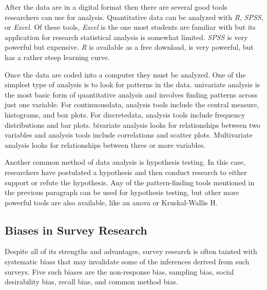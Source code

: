 After the data are in a digital format then there are several good tools researchers can use for analysis. Quantitative data can be analyzed with \textit{R}, \textit{SPSS}, or \textit{Excel}. Of these tools, \textit{Excel} is the one most students are familiar with but its application for research statistical analysis is somewhat limited. \textit{SPSS} is very powerful but expensive. \textit{R} is available as a free download, is very powerful, but has a rather steep learning curve. 

Once the data are coded into a computer they must be analyzed. One of the simplest type of analysis is to look for patterns in the data. \Gls{univariate} analysis is the most basic form of quantitative analysis and involves finding patterns across just one variable. For \gls{continuousdata}, analysis tools include the central measure, histograms, and box plots. For \gls{discretedata}, analysis tools include frequency distributions and bar plots. \Gls{bivariate} analysis looks for relationships between two variables and analysis tools include correlations and scatter plots. Multivariate analysis looks for relationships between three or more variables. 

Another common method of data analysis is hypothesis testing. In this case, researchers have postulated a \gls{hypothesis} and then conduct research to either support or refute the hypothesis. Any of the pattern-finding tools mentioned in the previous paragraph can be used for hypothesis testing, but other more powerful tools are also available, like an \gls{anova} or Kruskal-Wallis H.

\subsection{Biases in Survey Research}

Despite all of its strengths and advantages, survey research is often tainted with systematic \glspl{bias} that may invalidate some of the inferences derived from such surveys. Five such biases are the non-response bias, sampling bias, social desirability bias, recall bias, and common method bias.

